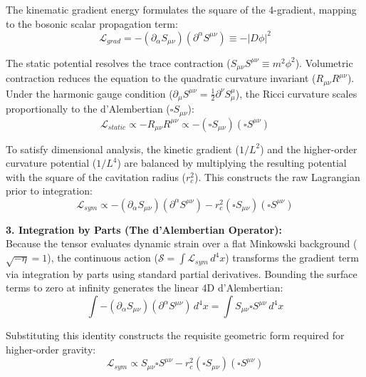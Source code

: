 The kinematic gradient energy formulates the square of the 4-gradient, mapping to the bosonic scalar propagation term:
\begin{equation}
    \mathcal{L}_{grad} = -(\partial_\alpha S_{\mu\nu})(\partial^\alpha S^{\mu\nu}) \equiv -|D\phi|^2
\end{equation}

The static potential resolves the trace contraction ($S_{\mu\nu}S^{\mu\nu} \equiv m^2\phi^2$). Volumetric contraction reduces the equation to the quadratic curvature invariant ($R_{\mu\nu}R^{\mu\nu}$). Under the harmonic gauge condition ($\partial_\mu S^{\mu\nu} = \frac{1}{2}\partial^\nu S^\mu_\mu$), the Ricci curvature scales proportionally to the d'Alembertian ($\square S_{\mu\nu}$): 
\begin{equation}
    \mathcal{L}_{static} \propto - R_{\mu\nu}R^{\mu\nu} \propto - (\square S_{\mu\nu})(\square S^{\mu\nu})
\end{equation}

To satisfy dimensional analysis, the kinetic gradient ($1/L^2$) and the higher-order curvature potential ($1/L^4$) are balanced by multiplying the resulting potential with the square of the cavitation radius ($r_c^2$). This constructs the raw Lagrangian prior to integration: 
\begin{equation}
    \mathcal{L}_{sym} \propto -(\partial_\alpha S_{\mu\nu})(\partial^\alpha S^{\mu\nu}) - r_c^2 (\square S_{\mu\nu})(\square S^{\mu\nu})
\end{equation}

\textbf{3. Integration by Parts (The d'Alembertian Operator):} \\
Because the tensor evaluates dynamic strain over a flat Minkowski background ($\sqrt{-\eta} = 1$), the continuous action ($\mathcal{S} = \int \mathcal{L}_{sym} \, d^4x$) transforms the gradient term via integration by parts using standard partial derivatives. Bounding the surface terms to zero at infinity generates the linear 4D d'Alembertian:
\begin{equation}
    \int -(\partial_\alpha S_{\mu\nu})(\partial^\alpha S^{\mu\nu}) \, d^4x = \int S_{\mu\nu} \square S^{\mu\nu} \, d^4x 
\end{equation}

Substituting this identity constructs the requisite geometric form required for higher-order gravity: 
\begin{equation}
    \mathcal{L}_{sym} \propto S_{\mu\nu} \square S^{\mu\nu} - r_c^2 (\square S_{\mu\nu})(\square S^{\mu\nu})
\end{equation}

